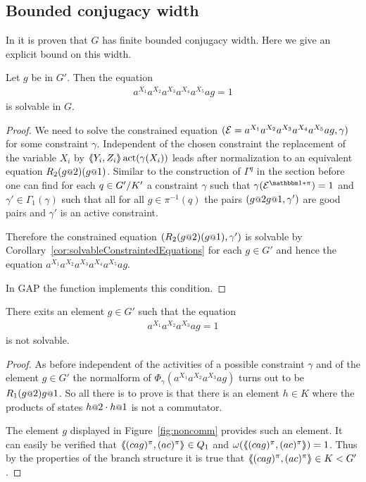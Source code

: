 \documentclass[a4paper,11pt]{amsart}
\begin{document}
\subsection{Bounded conjugacy width}
In \cite{Fink:Conjugacy_growth} it is proven that $G$ has finite bounded conjugacy width. Here we give an explicit bound 
on this width.
\begin{pro}\label{pro:productOf6Conjugates}
 Let $g$ be in $G'$. Then the equation 
 \begin{align*}
  a^{X_1}a^{X_2}a^{X_3}a^{X_4}a^{X_5}ag=1
 \end{align*}
is solvable in $G$. 
\end{pro}
\begin{proof}
We need to solve the constrained equation $(\mathcal{E}=a^{X_1}a^{X_2}a^{X_3}a^{X_4}a^{X_5}ag,\gamma)$ for
some constraint $\gamma$. Independent of the chosen constraint the replacement of
the variable $X_i$ by $\langle\negthickspace\langle Y_i,Z_i\rangle\negthickspace\rangle\operatorname{act}(\gamma(X_i))$ leads after normalization to an equivalent equation 
$R_2(g\at{2})(g\at{1})$. Similar to the construction of $\Gamma^q$ in the section
before one can find for each $q\in{G'/K'}$ a constraint $\gamma$ such that
$\gamma(\eq{E}^{\id*\pi})=1$ and $\gamma'\in\Gamma_1(\gamma)$ such that all for all 
$g\in\pi^{-1}(q)$ the pairs $(g\at{2}g\at{1},\gamma')$ are good pairs and $\gamma'$ is 
an active constraint.

Therefore the constrained equation $(R_2(g\at{2})(g\at{1}),\gamma')$ is solvable
by Corollary~\ref{cor:solvableConstraintedEquations}
for each $g\in G'$ and hence the equation $a^{X_1}a^{X_2}a^{X_3}a^{X_4}a^{X_5}ag$.

In GAP the function  implements 
this condition.
\end{proof}	
\begin{lem}
 There exits an element $g\in G'$ such that the equation 
 \begin{align*}
  a^{X_1}a^{X_2}a^{X_3}ag=1
 \end{align*}
 is not solvable.
\end{lem}
\begin{proof}
As before independent of the activities of a possible constraint $\gamma$ and of the element $g\in G'$
the normalform of $\Phi_\gamma(a^{X_1}a^{X_2}a^{X_3}ag)$ turns out to
be $R_1(g\at{2}) g\at{1}$. So all there is to prove is that there is an element $h\in K$
where the products of states $h\at{2}\cdot h\at{1}$ is not a commutator.

The element $g$ displayed in Figure~\ref{fig:noncomm} provides such an element. It can easily be verified 
that $\langle\negthickspace\langle(cag)^\pi,(ac)^\pi\rangle\negthickspace\rangle\in Q_1$ and $\omega(\langle\negthickspace\langle(cag)^\pi,(ac)^\pi\rangle\negthickspace\rangle)=1$. Thus by
the properties of the branch structure it is true that $\langle\negthickspace\langle(cag)^\pi,(ac)^\pi\rangle\negthickspace\rangle\in K<G'$. 
\end{proof}
\end{document}
